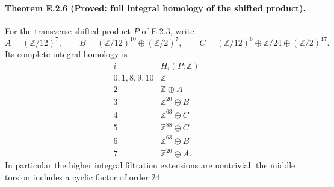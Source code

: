 \paragraph{Theorem E.2.6 (Proved: full integral homology of the shifted product).}
For the transverse shifted product $P$ of E.2.3, write
\[
 A=(\mathbb Z/12)^7,\qquad
 B=(\mathbb Z/12)^{10}\oplus(\mathbb Z/2)^7,\qquad
 C=(\mathbb Z/12)^6\oplus\mathbb Z/24\oplus(\mathbb Z/2)^{17}.
\]
Its complete integral homology is
\[
 \begin{array}{c|l}
 i&H_i(P;\mathbb Z)\\\hline
 0,1,8,9,10&\mathbb Z\\
 2&\mathbb Z\oplus A\\
 3&\mathbb Z^{20}\oplus B\\
 4&\mathbb Z^{63}\oplus C\\
 5&\mathbb Z^{88}\oplus C\\
 6&\mathbb Z^{63}\oplus B\\
 7&\mathbb Z^{20}\oplus A.
 \end{array}
\]
In particular the higher integral filtration extensions are nontrivial:
the middle torsion includes a cyclic factor of order $24$.
